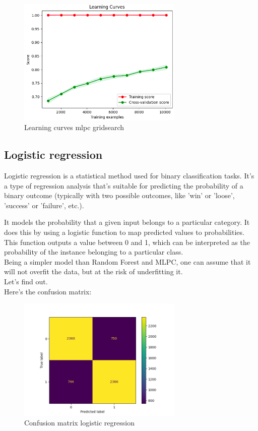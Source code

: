 \documentclass[a4paper,12pt]{article}
\begin{document}
\begin{figure}[H]
  \centering
  \includegraphics[width=0.7\textwidth]{./images/lc_mlpc_gridsearch.png}
  \caption{Learning curves mlpc gridsearch}
  \label{fig:lc_mlpc_gridsearch}
\end{figure}

\subsection{Logistic regression}

Logistic regression is a statistical method used for binary classification tasks. It's a type of regression analysis that's suitable for predicting the probability of a binary outcome (typically with two possible outcomes, like 'win' or 'loose', 'success' or 'failure', etc.).

It models the probability that a given input belongs to a particular category. It does this by using a logistic function to map predicted values to probabilities. This function outputs a value between 0 and 1, which can be interpreted as the probability of the instance belonging to a particular class.\\

Being a simpler model than Random Forest and MLPC, one can assume that it will not overfit the data, but at the risk of underfitting it.\\

Let's find out.\\

Here's the confusion matrix:
\begin{figure}[H]
  \centering
  \includegraphics[width=0.7\textwidth]{./images/confusion_matrix_logistic.png}
  \caption{Confusion matrix logistic regression}
  \label{fig:cm_logistic}
\end{figure}
\end{document}
